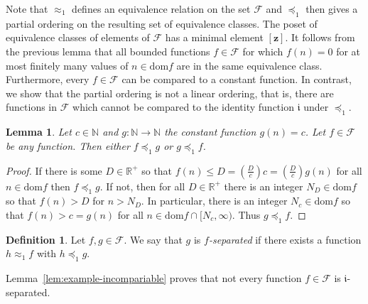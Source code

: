 \documentclass[11pt]{amsart}
\newcommand{\preceqF}{\preceq_1}
\newcommand{\approxF}{\approx_1}
\newtheorem{lemma}[theorem]{Lemma}
\theoremstyle{definition}
\newtheorem{definition}[theorem]{Definition}
\newcommand\N{\mathbb N}
\newcommand\Rplus{\mathbb R^+}
\newcommand\dom{\mathrm{dom}}
\newcommand\F{\mathcal F}
\newcommand{\ii}{\mathfrak{i}}
\begin{document}
Note that $\approxF$ defines an equivalence relation
on the set $\F$ and $\preceqF$ then gives a partial ordering on the resulting set of equivalence classes.
The poset of equivalence classes of elements of
$\F$ has a minimal element $[\mathbf z]$.
It follows from the previous lemma that all bounded
functions  $f\in\F$ for which $f(n)=0$ for at most finitely many values of $n\in\dom f$
are in the same equivalence class.
Furthermore, every $f \in \F$ can be compared to a constant function. In contrast, we show that the partial ordering is not a linear ordering, that is, there are functions in $\F$ which cannot be compared to the identity function $\ii$ under $\preceqF$.


\begin{lemma}\label{lemma:comp_to_constant}
Let $c \in \N$ and $g: \N \rightarrow \N$ the constant function $g(n)=c$.  Let $f \in  \F$ be any function.  Then either $f\preceqF g$ or $g\preceqF f$.
\end{lemma}

\begin{proof}
If
there is some $D\in \Rplus$ so that $f(n)\leq D=\left(\frac{D}{c}\right)c=\left(\frac{D}{c}\right)g(n)$ for all $n\in\dom f$ then $f\preceqF g$.
If not, then for all $D\in \Rplus$ there is an integer $N_D\in\dom f$ so that $f(n)>D$ for $n>N_D$. In particular, there is an integer $N_c \in \dom f$ so that $f(n)>c=g(n)$ for all $n\in \dom f\cap [N_c,\infty)$.  Thus $g\preceqF f$.
\end{proof}


\begin{definition}\label{defn:isep}
Let $f,g\in \F$. We say that $g$ is {\em $f$-separated} if there exists a function $h\approxF f$ with $h\preceqF g$.
\end{definition}
Lemma~\ref{lem:example-incompariable} proves that not every function $f\in \F$ is $\ii$-separated.
\end{document}
